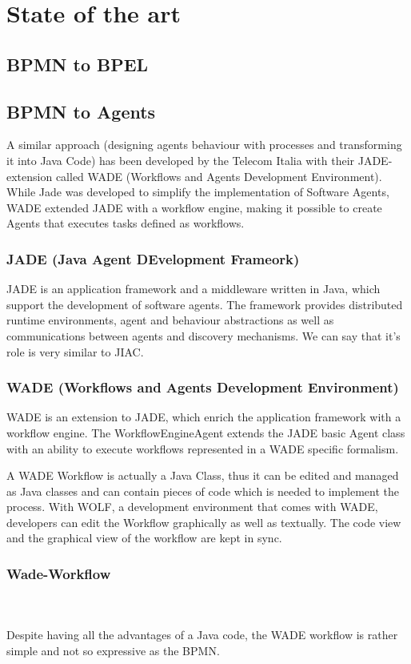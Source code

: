\chapter{State of the art}

\section{BPMN to BPEL}



\section{BPMN to Agents}
A similar approach (designing agents behaviour with processes and transforming it into Java Code) has been developed by the Telecom Italia with their JADE-extension called WADE (Workflows and Agents Development Environment). While Jade was developed to simplify the implementation of Software Agents, WADE extended JADE with a workflow engine, making it possible to create Agents that executes tasks defined as workflows.

\subsection{JADE (\textbf{J}ava \textbf{A}gent \textbf{DE}velopment Frameork)}
JADE is an application framework and a middleware written in Java, which support the development of software agents. The framework  provides distributed runtime environments, agent and behaviour abstractions as well as communications between agents and discovery mechanisms. We can say that it's role is very similar to JIAC.

\subsection{WADE (Workflows and Agents Development Environment)}
WADE is an extension to JADE, which enrich the application framework with a workflow engine. The WorkflowEngineAgent extends the JADE basic Agent class with an ability to execute workflows represented in a WADE specific formalism.

A WADE Workflow is actually a Java Class, thus it can be edited and managed as Java classes and can contain pieces of code which is needed to implement the process. With WOLF, a development environment that comes with WADE, developers can edit the Workflow graphically as well as textually. The code view and the graphical view of the workflow are kept in sync. 


\subsection{Wade-Workflow}
\\\\
Despite having all the advantages of a Java code, the WADE workflow is rather simple and not so expressive as the BPMN.
